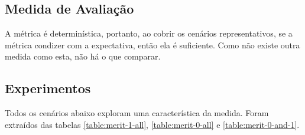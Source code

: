 \documentclass[preprint,12pt]{elsarticle}
\begin{document}
\subsection{Medida de Avaliação}
A métrica é determinística, portanto, ao cobrir os cenários representativos, se a métrica condizer com a expectativa, então ela é suficiente. Como não existe outra medida como esta, não há o que comparar.

\subsection{Experimentos}

Todos os cenários abaixo exploram uma característica da medida. Foram extraídos das tabelas \ref{table:merit-1-all}, \ref{table:merit-0-all} e \ref{table:merit-0-and-1}.
\end{document}
